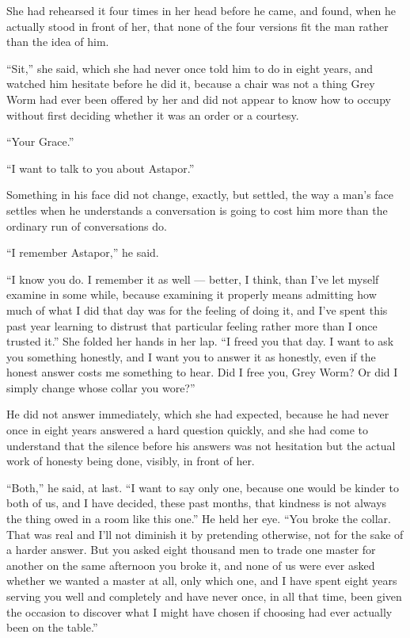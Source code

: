 She had rehearsed it four times in her head before he came, and found, when he actually stood in front of her, that none of the four versions fit the man rather than the idea of him.

“Sit,” she said, which she had never once told him to do in eight years, and watched him hesitate before he did it, because a chair was not a thing Grey Worm had ever been offered by her and did not appear to know how to occupy without first deciding whether it was an order or a courtesy.

“Your Grace.”

“I want to talk to you about Astapor.”

Something in his face did not change, exactly, but settled, the way a man’s face settles when he understands a conversation is going to cost him more than the ordinary run of conversations do.

“I remember Astapor,” he said.

“I know you do. I remember it as well — better, I think, than I’ve let myself examine in some while, because examining it properly means admitting how much of what I did that day was for the feeling of doing it, and I’ve spent this past year learning to distrust that particular feeling rather more than I once trusted it.” She folded her hands in her lap. “I freed you that day. I want to ask you something honestly, and I want you to answer it as honestly, even if the honest answer costs me something to hear. Did I free you, Grey Worm? Or did I simply change whose collar you wore?”

\sceneBreak

He did not answer immediately, which she had expected, because he had never once in eight years answered a hard question quickly, and she had come to understand that the silence before his answers was not hesitation but the actual work of honesty being done, visibly, in front of her.

“Both,” he said, at last. “I want to say only one, because one would be kinder to both of us, and I have decided, these past months, that kindness is not always the thing owed in a room like this one.” He held her eye. “You broke the collar. That was real and I’ll not diminish it by pretending otherwise, not for the sake of a harder answer. But you asked eight thousand men to trade one master for another on the same afternoon you broke it, and none of us were ever asked whether we wanted a master at all, only which one, and I have spent eight years serving you well and completely and have never once, in all that time, been given the occasion to discover what I might have chosen if choosing had ever actually been on the table.”

